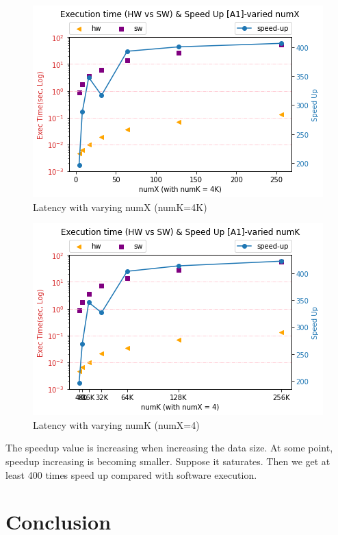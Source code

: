 \documentclass{sig-alternate}
\begin{document}
\begin{figure}[h!]
    \centering
    \includegraphics[width=0.85\columnwidth]{figure/K-4K-X-vary.png}
    \caption{Latency with varying numX (numK=4K)}
    \label{fig-a1-x}
\end{figure}

\begin{figure}[h!]
    \centering
    \includegraphics[width=0.85\columnwidth]{figure/X-4-K-vary.png}
    \caption{Latency with varying numK (numX=4)}
    \label{fig-a1-k}
\end{figure}

The speedup value is increasing when increasing the data size. At some point, speedup increasing is becoming smaller. Suppose it saturates. Then we get at least 400 times speed up compared with software execution.

\section{Conclusion}
\end{document}
